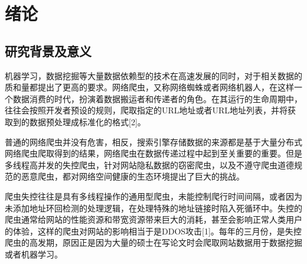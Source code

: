 \documentclass[doctor,privacy,twoside]{buaa_mac}
\begin{document}



\chapter{绪论}


\section{研究背景及意义}
机器学习，数据挖掘等大量数据依赖型的技术在高速发展的同时，对于相关数据的质和量都提出了更高的要求。网络爬虫，又称网络蜘蛛或者网络机器人，在这样一个数据消费的时代，扮演着数据搬运者和传递者的角色。在其运行的生命周期中，往往会按照开发者预设的规则，爬取指定的URL地址或者URL地址列表，并将获取到的数据预处理成标准化的格式[2]。

普通的网络爬虫并没有危害，相反，搜索引擎存储数据的来源都是基于大量分布式网络爬虫爬取得到的结果，网络爬虫在数据传递过程中起到至关重要的重要。但是多线程高并发的失控爬虫，针对网站隐私数据的窃密爬虫，以及不遵守爬虫道德规范的恶意爬虫，都对网络空间健康的生态环境提出了巨大的挑战。

爬虫失控往往是具有多线程操作的通用型爬虫，未能控制爬行时间间隔，或者因为未添加地址环回检测的处理逻辑，在处理特殊的地址链接时陷入死循环中。失控的爬虫通常给网站的性能资源和带宽资源带来巨大的消耗，甚至会影响正常人类用户的体验，这样的爬虫对网站的影响相当于是DDOS攻击[1]。每年的三月份，是失控爬虫的高发期，原因正是因为大量的硕士在写论文时会爬取网站数据用于数据挖掘或者机器学习。
\end{document}

